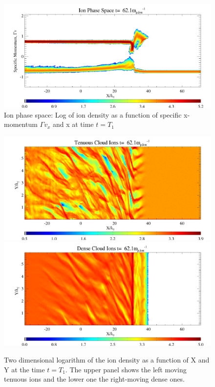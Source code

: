 \documentclass[structabstract]{aa}
\begin{document}
 
\begin{figure}
\centering
\includegraphics[width=\columnwidth]{15294f04.png}
\caption{Ion phase space: Log of ion density as a function of specific 
x-momentum $\Gamma v_x$ and x at time $t=T_1$} \label{FigIonPS1}
\end{figure}
     

\begin{figure}
\centering
\includegraphics[width=\columnwidth]{15294f5a.png}
\includegraphics[width=\columnwidth]{15294f5b.png}
\caption{Two dimensional logarithm of the ion density as a function of X 
and Y at the time $t=T_1$. The upper panel shows the left moving tenuous
ions and the lower one the right-moving dense ones.}\label{FigIonLeftRightT1}
\end{figure}
\end{document}
